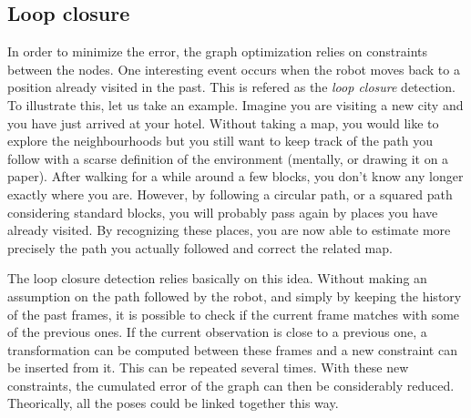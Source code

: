 \subsection{Loop closure}

In order to minimize the error, the graph optimization relies on constraints between the nodes. One interesting event occurs when the robot moves back to a position already visited in the past. This is refered as the \emph{loop closure} detection. To illustrate this, let us take an example. Imagine you are visiting a new city and you have just arrived at your hotel. Without taking a map, you would like to explore the neighbourhoods but you still want to keep track of the path you follow with a scarse definition of the environment (mentally, or drawing it on a paper). After walking for a while around a few blocks, you don't know any longer exactly where you are. However, by following a circular path, or a squared path considering standard blocks, you will probably pass again by places you have already visited. By recognizing these places, you are now able to estimate more precisely the path you actually followed and correct the related map.

The loop closure detection relies basically on this idea. Without making an assumption on the path followed by the robot, and simply by keeping the history of the past frames, it is possible to check if the current frame matches with some of the previous ones. If the current observation is close to a previous one, a transformation can be computed between these frames and a new constraint can be inserted from it. This can be repeated several times. With these new constraints, the cumulated error of the graph can then be considerably reduced. Theorically, all the poses could be linked together this way. 

